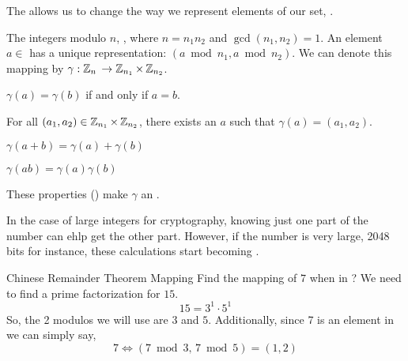 \begin{definition}\label{def:Chinese_Remainder_Theorem}
  The \emph{} allows us to change the way we represent elements of our set, \TextIntsModN{}.

  The integers modulo $n$, \TextIntsModN{}, where $n = n_{1}n_{2}$ and $\gcd(n_{1}, n_{2}) = 1$.
  An element $a \in$ \TextIntsModN{} has a unique representation: $(a \bmod n_{1}, a \bmod n_{2})$.
  We can denote this mapping by $\gamma : \operatorname{\mathbb{Z}}_{n}{} \to \operatorname{\mathbb{Z}}_{n_{1}} \times \operatorname{\mathbb{Z}}_{n_{2}}$.
  \begin{propertylist}
  \item $\gamma(a) = \gamma(b)$ if and only if $a = b$. \label{prop:Chinese_Remainder_Theorem_Property-Equivalence}
  \item For all $(a_{1}, a_{2}) \in \operatorname{\mathbb{Z}}_{n_{1}} \times \operatorname{\mathbb{Z}}_{n_{2}}$, there exists an $a$ such that $\gamma(a) = (a_{1}, a_{2})$.
  \item $\gamma(a+b) = \gamma(a) + \gamma(b)$
  \item $\gamma(ab) = \gamma(a) \gamma(b)$ \label{prop:Chinese_Remainder_Theorem_Property-Multiplication}
  \end{propertylist}
  These properties () make $\gamma$ an \emph{}.

  \begin{remark}
    In the case of large integers for cryptography, knowing just one part of the number can ehlp get the other part.
    However, if the number is very large, 2048 bits for instance, these calculations start becoming .
  \end{remark}
\end{definition}

\begin{example}[]{Chinese Remainder Theorem Mapping}
  Find the mapping of $7$ when in ?
  \tcblower{}
  We need to find a prime factorization for $15$.
  \begin{equation*}
    15 = 3^{1} \cdot 5^{1}
  \end{equation*}
  So, the 2 modulos we will use are $3$ and $5$.
  Additionally, since 7 is an element in  we can simply say,
  \begin{equation*}
    7 \Leftrightarrow (7 \bmod 3,\, 7 \bmod 5) = (1, 2)
  \end{equation*}
\end{example}

